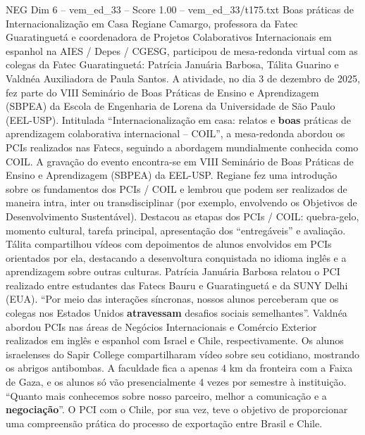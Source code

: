 \begin{textsample}{NEG Dim 6 – vem\_ed\_33 – Score 1.00 – vem\_ed\_33/t175.txt}  \label{ex:f6_neg_094}
Boas práticas de Internacionalização em Casa Regiane Camargo, professora da Fatec Guaratinguetá e coordenadora de Projetos Colaborativos Internacionais em espanhol na AIES / Depes / CGESG, participou de mesa-redonda virtual com as colegas da Fatec Guaratinguetá: Patrícia Januária Barbosa, Tálita Guarino e Valdnéa Auxiliadora de Paula Santos.
A atividade, no dia 3 de dezembro de 2025, fez parte do VIII Seminário de Boas Práticas de Ensino e Aprendizagem (SBPEA) da Escola de Engenharia de Lorena da Universidade de São Paulo (EEL-USP).
Intitulada “Internacionalização em casa: relatos e \textbf{boas} práticas de aprendizagem colaborativa internacional – COIL”, a mesa-redonda abordou os PCIs realizados nas Fatecs, seguindo a abordagem mundialmente conhecida como COIL.
A gravação do evento encontra-se em VIII Seminário de Boas Práticas de Ensino e Aprendizagem (SBPEA) da EEL-USP.
Regiane fez uma introdução sobre os fundamentos dos PCIs / COIL e lembrou que podem ser realizados de maneira intra, inter ou transdisciplinar (por exemplo, envolvendo os Objetivos de Desenvolvimento Sustentável).
Destacou as etapas dos PCIs / COIL: quebra-gelo, momento cultural, tarefa principal, apresentação dos “entregáveis” e avaliação.
Tálita compartilhou vídeos com depoimentos de alunos envolvidos em PCIs orientados por ela, destacando a desenvoltura conquistada no idioma inglês e a aprendizagem sobre outras culturas.
Patrícia Januária Barbosa relatou o PCI realizado entre estudantes das Fatecs Bauru e Guaratinguetá e da SUNY Delhi (EUA). “Por meio das interações síncronas, nossos alunos perceberam que os colegas nos Estados Unidos \textbf{atravessam} desafios sociais semelhantes”.
Valdnéa abordou PCIs nas áreas de Negócios Internacionais e Comércio Exterior realizados em inglês e espanhol com Israel e Chile, respectivamente.
Os alunos israelenses do Sapir College compartilharam vídeo sobre seu cotidiano, mostrando os abrigos antibombas.
A faculdade fica a apenas 4 km da fronteira com a Faixa de Gaza, e os alunos só vão presencialmente 4 vezes por semestre à instituição. “Quanto mais conhecemos sobre nosso parceiro, melhor a comunicação e a \textbf{negociação}”.
O PCI com o Chile, por sua vez, teve o objetivo de proporcionar uma compreensão prática do processo de exportação entre Brasil e Chile.

\end{textsample}
